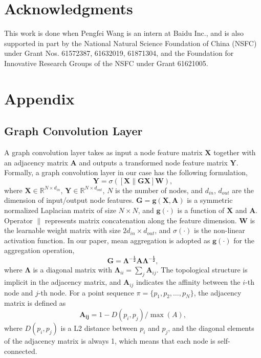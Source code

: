 \documentclass[letterpaper]{article} \usepackage{aaai21}  \usepackage{times}  \usepackage{helvet} \usepackage{courier}  \usepackage[hyphens]{url}  \usepackage{graphicx} \urlstyle{rm} \def\UrlFont{\rm}  \usepackage{natbib}  \usepackage{caption} \usepackage{bm}
\begin{document}
\section*{Acknowledgments}
This work is done when Pengfei Wang is an intern at Baidu Inc., and is also supported in part by the National Natural Science Foundation of China (NSFC) under Grant Nos. 61572387, 61632019, 61871304, and the Foundation for Innovative Research Groups of the NSFC under Grant 61621005. 



\section{Appendix}
\subsection{Graph Convolution Layer}
A graph convolution layer takes as input a node feature matrix $\bm{X}$ together with an adjacency matrix $\bm{A}$ and outputs a transformed node feature matrix $\bm{Y}$.
Formally, a graph convolution layer in our case has the following formulation,
\begin{equation}
    \bm{Y} = \sigma([\bm{X}\|\bm{G}\bm{X}]\bm{W}),
\end{equation}
where $\bm{X} \in \mathbb{R}^{N\times d_{in}}$, $\bm{Y} \in \mathbb{R}^{N\times d_{out}}$, $N$ is the number of nodes, and $d_{in}$, $d_{out}$ are the dimension of input/output node features.
$\bm{G} = \bm{g}(\bm{X},\bm{A})$ is a symmetric normalized Laplacian matrix of size $N \times N$, and $\bm{g(\cdot)}$ is a function of $\bm{X}$ and $\bm{A}$. 
Operator $\|$ represents matrix concatenation along the feature dimension.
$\bm{W}$ is the learnable weight matrix with size $2d_{in} \times d_{out}$, and $\sigma(\cdot)$ is the non-linear activation function. In our paper, mean aggregation is adopted as $\bm{g(\cdot)}$ for the aggregation operation, 
\begin{equation}
    \bm{G}=\bm{\Lambda^{-\frac{1}{2}}}\bm{A}\bm{\Lambda^{-\frac{1}{2}}},
\end{equation}
where $\bm{\Lambda}$ is a diagonal matrix with $\bm{\Lambda}_{ii}=\sum_j \bm{A}_{ij}$. The topological structure is implicit in the adjacency matrix, and $\bm{A}_{ij}$ indicates the affinity between the ${i}$-th node and ${j}$-th node. For a point sequence $\pi = \{ p_1, p_2, \dots, p_N \}$,  the adjacency matrix is defined as
\begin{equation}
    \bm{A_{ij}}=1 - D(p_i, p_j) / \max(A),
\end{equation}
where $D(p_i, p_j)$ is a L2 distance between $p_i$ and $p_j$, and the diagonal elements of the adjacency matrix is always 1, which means that each node is self-connected. 
\end{document}

